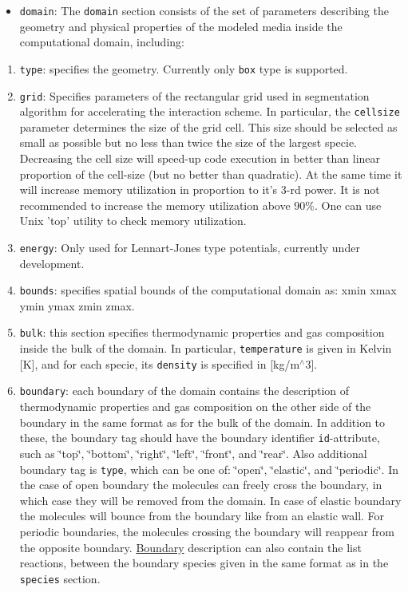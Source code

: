 \begin{itemize}
\item {\tt domain}: The {\tt domain} section consists of the set of parameters describing the geometry and physical properties of the modeled media inside the computational domain, including:\end{itemize}
\begin{enumerate}
\item {\tt type}: specifies the geometry. Currently only {\tt box} type is supported.\item {\tt grid}: Specifies parameters of the rectangular grid used in segmentation algorithm for accelerating the interaction scheme. In particular, the {\tt cellsize} parameter determines the size of the grid cell. This size should be selected as small as possible but no less than twice the size of the largest specie. Decreasing the cell size will speed-up code execution in better than linear proportion of the cell-size (but no better than quadratic). At the same time it will increase memory utilization in proportion to it's 3-rd power. It is not recommended to increase the memory utilization above 90\%. One can use Unix 'top' utility to check memory utilization.\item {\tt energy}: Only used for Lennart-Jones type potentials, currently under development.\item {\tt bounds}: specifies spatial bounds of the computational domain as: xmin xmax ymin ymax zmin zmax.\item {\tt bulk}: this section specifies thermodynamic properties and gas composition inside the bulk of the domain. In particular, {\tt temperature} is given in Kelvin \mbox{[}K\mbox{]}, and for each specie, its {\tt density} is specified in \mbox{[}kg/m$^\wedge$3\mbox{]}.\item {\tt boundary}: each boundary of the domain contains the description of thermodynamic properties and gas composition on the other side of the boundary in the same format as for the bulk of the domain. In addition to these, the boundary tag should have the boundary identifier {\tt id}-attribute, such as \char`\"{}top\char`\"{}, \char`\"{}bottom\char`\"{}, \char`\"{}right\char`\"{}, \char`\"{}left\char`\"{}, \char`\"{}front\char`\"{}, and \char`\"{}rear\char`\"{}. Also additional boundary tag is {\tt type}, which can be one of: \char`\"{}open\char`\"{}, \char`\"{}elastic\char`\"{}, and \char`\"{}periodic\char`\"{}. In the case of open boundary the molecules can freely cross the boundary, in which case they will be removed from the domain. In case of elastic boundary the molecules will bounce from the boundary like from an elastic wall. For periodic boundaries, the molecules crossing the boundary will reappear from the opposite boundary. \hyperlink{structBoundary}{Boundary} description can also contain the list reactions, between the boundary species given in the same format as in the {\tt species} section.\end{enumerate}


